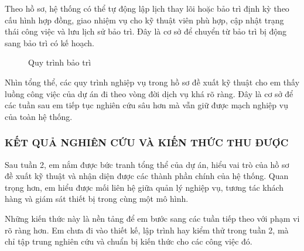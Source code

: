 Theo hồ sơ, hệ thống có thể tự động lập lịch thay lõi hoặc bảo trì định kỳ theo cấu hình hợp đồng, giao nhiệm vụ cho kỹ thuật viên phù hợp, cập nhật trạng thái công việc và lưu lịch sử bảo trì. Đây là cơ sở để chuyển từ bảo trì bị động sang bảo trì có kế hoạch.

\begin{figure}[H]
    \centering
    \caption{Quy trình bảo trì}
    \label{fig:maintenance_process}
\end{figure}


Nhìn tổng thể, các quy trình nghiệp vụ trong hồ sơ đề xuất kỹ thuật cho em thấy luồng công việc của dự án đi theo vòng đời dịch vụ khá rõ ràng. Đây là cơ sở để các tuần sau em tiếp tục nghiên cứu sâu hơn mà vẫn giữ được mạch nghiệp vụ của toàn hệ thống.

\subsubsection{KẾT QUẢ NGHIÊN CỨU VÀ KIẾN THỨC THU ĐƯỢC}

Sau tuần 2, em nắm được bức tranh tổng thể của dự án, hiểu vai trò của hồ sơ đề xuất kỹ thuật và nhận diện được các thành phần chính của hệ thống. Quan trọng hơn, em hiểu được mối liên hệ giữa quản lý nghiệp vụ, tương tác khách hàng và giám sát thiết bị trong cùng một mô hình.

Những kiến thức này là nền tảng để em bước sang các tuần tiếp theo với phạm vi rõ ràng hơn. Em chưa đi vào thiết kế, lập trình hay kiểm thử trong tuần 2, mà chỉ tập trung nghiên cứu và chuẩn bị kiến thức cho các công việc đó.
